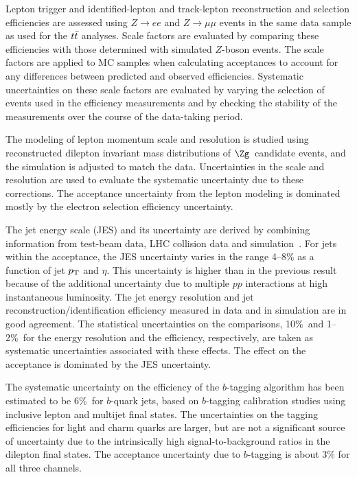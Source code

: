 Lepton trigger and identified-lepton and track-lepton
reconstruction and selection efficiencies are assessed using
$Z\rightarrow ee$ and $Z\rightarrow\mu\mu$ events in the same data
sample as used for the $t\bar{t}$ analyses.
Scale factors are evaluated by comparing these efficiencies with those determined with simulated $Z$-boson events. The scale factors are applied to MC samples when calculating
acceptances to account for any differences between predicted and observed efficiencies.  Systematic uncertainties on these scale factors are evaluated by varying the selection of events used in the efficiency measurements and by checking the stability of the measurements over the course of the data-taking period.

The modeling of lepton momentum scale and resolution is studied using
reconstructed dilepton invariant mass distributions of $\Zg$\ candidate events, and
the simulation is adjusted to match the data.  Uncertainties in the scale and resolution are used to
evaluate the systematic uncertainty due to these corrections.
The acceptance uncertainty from the lepton modeling is dominated
mostly by the electron selection efficiency uncertainty.

The jet energy scale (JES) and its uncertainty are derived by
combining information from test-beam data, LHC collision data and
simulation~\cite{jetcor}.
For jets within the acceptance, the JES uncertainty varies
in the range 4--8\%
as a function of jet $p_{\mathrm{T}}$ and $\eta$. This uncertainty is higher than in the previous result~\cite{ATL-CONF-2011-034} because of the additional uncertainty due to multiple $pp$ interactions at high instantaneous luminosity. The jet energy
resolution and jet reconstruction/identification efficiency measured in data and in
simulation are in good agreement. The statistical uncertainties on the
comparisons,  10\%\ and 1--2\%\ for the energy resolution and the efficiency,
respectively, are taken as systematic uncertainties associated with these effects.
The effect on the acceptance is dominated by the JES uncertainty.


The systematic uncertainty on the efficiency of the $b$-tagging algorithm has been estimated to be $6$\%\ for $b$-quark jets, based on $b$-tagging calibration studies using inclusive lepton and multijet final states.
The uncertainties on the tagging efficiencies for light and charm quarks are larger, but are not a significant source of uncertainty due to the
intrinsically high signal-to-background ratios in the dilepton final states.
The acceptance uncertainty due to $b$-tagging is about 3\% for all three channels.

